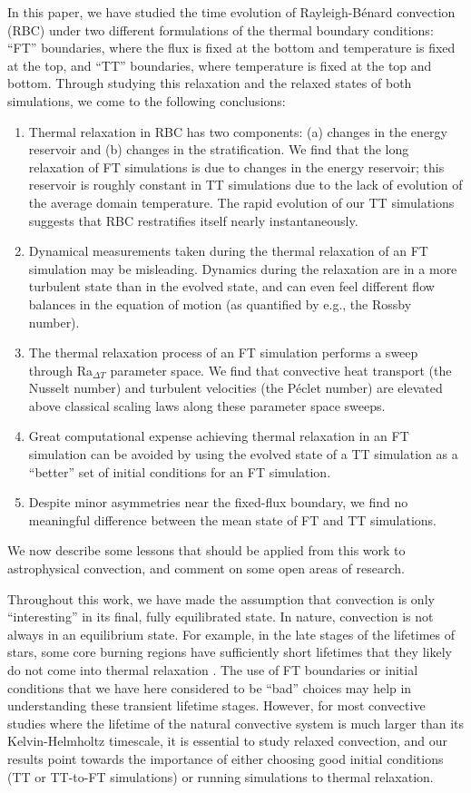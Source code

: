 \documentclass[aps, pre, onecolumn, nofootinbib, notitlepage, groupedaddress, amsfonts, amssymb, amsmath, longbibliography, superscriptaddress]{revtex4-1}
\newcommand{\RB}{Rayleigh-B\'{e}nard }
\begin{document}
In this paper, we have studied the time evolution of \RB convection (RBC) under two different formulations of the thermal boundary conditions: ``FT'' boundaries, where the flux is fixed at the bottom and temperature is fixed at the top, and ``TT'' boundaries, where temperature is fixed at the top and bottom.
Through studying this relaxation and the relaxed states of both simulations, we come to the following conclusions:
\begin{enumerate}
\item Thermal relaxation in RBC has two components: (a) changes in the energy reservoir and (b) changes in the stratification.
We find that the long relaxation of FT simulations is due to changes in the energy reservoir; this reservoir is roughly constant in TT simulations due to the lack of evolution of the average domain temperature.
The rapid evolution of our TT simulations suggests that RBC restratifies itself nearly instantaneously.
\item Dynamical measurements taken during the thermal relaxation of an FT simulation may be misleading.
Dynamics during the relaxation are in a more turbulent state than in the evolved state, and can even feel different flow balances in the equation of motion (as quantified by e.g., the Rossby number).
\item The thermal relaxation process of an FT simulation performs a sweep through Ra$_{\Delta T}$ parameter space.
We find that convective heat transport (the Nusselt number) and turbulent velocities (the P\'{e}clet number) are elevated above classical scaling laws along these parameter space sweeps.
\item Great computational expense achieving thermal relaxation in an FT simulation can be avoided by using the evolved state of a TT simulation as a ``better'' set of initial conditions for an FT simulation.
\item Despite minor asymmetries near the fixed-flux boundary, we find no meaningful difference between the mean state of FT and TT simulations.
\end{enumerate}
We now describe some lessons that should be applied from this work to astrophysical convection, and comment on some open areas of research.

Throughout this work, we have made the assumption that convection is only ``interesting'' in its final, fully equilibrated state.
In nature, convection is not always in an equilibrium state.
For example, in the late stages of the lifetimes of stars, some core burning regions have sufficiently short lifetimes that they likely do not come into thermal relaxation \citep{clarkson&all2018, andrassy&all2020}.
The use of FT boundaries or initial conditions that we have here considered to be ``bad'' choices may help in understanding these transient lifetime stages.
However, for most convective studies where the lifetime of the natural convective system is much larger than its Kelvin-Helmholtz timescale, it is essential to study relaxed convection, and our results point towards the importance of either choosing good initial conditions (TT or TT-to-FT simulations) or running simulations to thermal relaxation.
\end{document}

